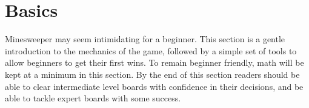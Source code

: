 \chapter{Basics}
Minesweeper may seem intimidating for a beginner. This section is a gentle introduction to the mechanics of the game, followed by a simple set of tools to allow beginners to get their first wins. To remain beginner friendly, math will be kept at a minimum in this section. By the end of this section readers should be able to clear intermediate level boards with confidence in their decisions, and be able to tackle expert boards with some success.\\







